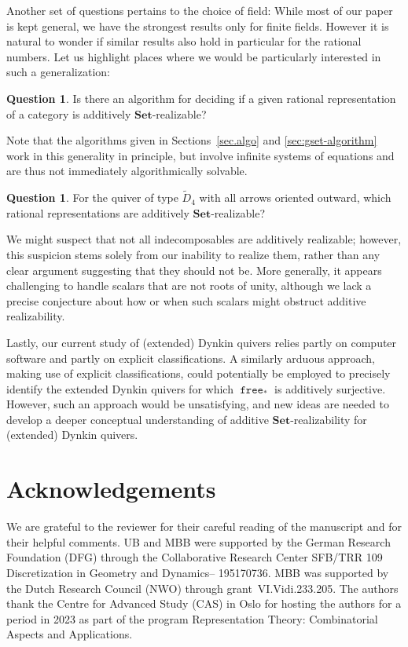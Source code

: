 \documentclass[a4paper]{amsart}
\theoremstyle{plain}
\theoremstyle{definition}
\newtheorem{question}[theorem]{Question}
\theoremstyle{remark}
\newcommand{\funct}[1]{\operatorname{\mathtt{#1}}}
\newcommand{\Set}{\mathbf{Set}}
\begin{document}
\medskip
Another set of questions pertains to the choice of field: While most of our paper is kept general, we have the strongest results only for finite fields. However it is natural to wonder if similar results also hold in particular for the rational numbers. Let us highlight places where we would be particularly interested in such a generalization:
\begin{question}
Is there an algorithm for deciding if a given rational representation of a category is additively $\Set$-realizable?
\end{question}
Note that the algorithms given in Sections~\ref{sec.algo} and \ref{sec:gset-algorithm} work in this generality in principle, but involve infinite systems of equations and are thus not immediately algorithmically solvable.
\begin{question}
For the quiver of type \( \tilde{D}_4 \) with all arrows oriented outward, which rational representations are additively $\Set$-realizable?
\end{question}
We might suspect that not all indecomposables are additively realizable; however, this suspicion stems solely from our inability to realize them, rather than any clear argument suggesting that they should not be. More generally, it appears challenging to handle scalars that are not roots of unity, although we lack a precise conjecture about how or when such scalars might obstruct additive realizability.

Lastly, our current study of (extended) Dynkin quivers relies partly on computer software and partly on explicit classifications. A similarly arduous approach, making use of explicit classifications, could potentially be employed to precisely identify the extended Dynkin quivers for which $\funct{free}_*$ is additively surjective. However, such an approach would be unsatisfying, and new ideas are needed to develop a deeper conceptual understanding of additive $\Set$-realizability for (extended) Dynkin quivers.

\section*{Acknowledgements}
We are grateful to the reviewer for their careful reading of the manuscript and for their helpful comments. UB and MBB were supported by the German Research Foundation (DFG) through the Collaborative Research Center SFB/TRR 109 Discretization in Geometry and Dynamics– 195170736. MBB was supported by the Dutch Research Council (NWO) through grant~VI.Vidi.233.205. The authors thank the Centre for Advanced Study (CAS) in Oslo for hosting the authors for a period in 2023 as part of the program Representation Theory: Combinatorial Aspects and Applications. 






\newpage\todos
\end{document}
